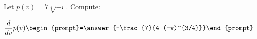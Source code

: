 \documentclass{ximera}
\author{Bart Snapp\and Nela Lakos}
\begin{document}
\begin{exercise}
Let $p(v) = 7 \sqrt[4]{-v}$. Compute:

\[
\frac{d}{dv}p(v)
\begin{prompt}=\answer{-\frac{7}{4 (-v)^{3/4}}}\end{prompt}
\]
\end{exercise}
\end{document}
